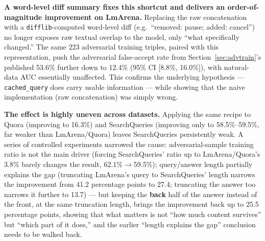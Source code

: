 \documentclass[11pt]{article}
\begin{document}
\textbf{A word-level diff summary fixes this shortcut and delivers an order-of-magnitude improvement on LmArena.} Replacing the raw concatenation with a \texttt{difflib}-computed word-level diff (e.g.\ ``removed: pause; added: cancel'') no longer exposes raw textual overlap to the model, only ``what specifically changed.'' The same 223 adversarial training triples, paired with this representation, push the adversarial false-accept rate from Section~\ref{sec:advtrain}'s published 53.6\% further down to 12.4\% (95\% CI [8.8\%, 16.0\%]), with natural-data AUC essentially unaffected. This confirms the underlying hypothesis --- \texttt{cached\_\allowbreak{}query} does carry usable information --- while showing that the naive implementation (raw concatenation) was simply wrong.

\textbf{The effect is highly uneven across datasets.} Applying the same recipe to Quora (improving to 16.3\%) and SearchQueries (improving only to 58.5\%--59.5\%, far weaker than LmArena/Quora) leaves SearchQueries persistently weak. A series of controlled experiments narrowed the cause: adversarial-sample training ratio is not the main driver (forcing SearchQueries' ratio up to LmArena/Quora's 3.8\% barely changes the result, 62.1\%$\to$59.5\%); query/answer length partially explains the gap (truncating LmArena's query to SearchQueries' length narrows the improvement from 41.2 percentage points to 27.4; truncating the answer too narrows it further to 13.7) --- but keeping the \textbf{back} half of the answer instead of the front, at the same truncation length, brings the improvement back up to 25.5 percentage points, showing that what matters is not ``how much content survives'' but ``which part of it does,'' and the earlier ``length explains the gap'' conclusion needs to be walked back.
\end{document}

